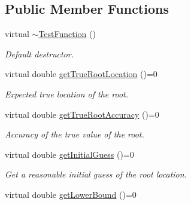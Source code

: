\subsection*{Public Member Functions}
\begin{DoxyCompactItemize}
\item 
virtual \hyperlink{structtudat_1_1unit__tests_1_1TestFunction_a48104bbfd74ad6abf913cafc4eda7abd}{$\sim$\+Test\+Function} ()\hypertarget{structtudat_1_1unit__tests_1_1TestFunction_a48104bbfd74ad6abf913cafc4eda7abd}{}\label{structtudat_1_1unit__tests_1_1TestFunction_a48104bbfd74ad6abf913cafc4eda7abd}

\begin{DoxyCompactList}\small\item\em Default destructor. \end{DoxyCompactList}\item 
virtual double \hyperlink{structtudat_1_1unit__tests_1_1TestFunction_abb3a0d4bf48c87d0527fb7397e354332}{get\+True\+Root\+Location} ()=0\hypertarget{structtudat_1_1unit__tests_1_1TestFunction_abb3a0d4bf48c87d0527fb7397e354332}{}\label{structtudat_1_1unit__tests_1_1TestFunction_abb3a0d4bf48c87d0527fb7397e354332}

\begin{DoxyCompactList}\small\item\em Expected true location of the root. \end{DoxyCompactList}\item 
virtual double \hyperlink{structtudat_1_1unit__tests_1_1TestFunction_aa9098ec74b5d6ecd616ed84b41ae4c39}{get\+True\+Root\+Accuracy} ()=0\hypertarget{structtudat_1_1unit__tests_1_1TestFunction_aa9098ec74b5d6ecd616ed84b41ae4c39}{}\label{structtudat_1_1unit__tests_1_1TestFunction_aa9098ec74b5d6ecd616ed84b41ae4c39}

\begin{DoxyCompactList}\small\item\em Accuracy of the true value of the root. \end{DoxyCompactList}\item 
virtual double \hyperlink{structtudat_1_1unit__tests_1_1TestFunction_ad97a92c0147206c0f4af9fc4e4ae210c}{get\+Initial\+Guess} ()=0\hypertarget{structtudat_1_1unit__tests_1_1TestFunction_ad97a92c0147206c0f4af9fc4e4ae210c}{}\label{structtudat_1_1unit__tests_1_1TestFunction_ad97a92c0147206c0f4af9fc4e4ae210c}

\begin{DoxyCompactList}\small\item\em Get a reasonable initial guess of the root location. \end{DoxyCompactList}\item 
virtual double \hyperlink{structtudat_1_1unit__tests_1_1TestFunction_a86026619c7617e7f216f93d31b053034}{get\+Lower\+Bound} ()=0\hypertarget{structtudat_1_1unit__tests_1_1TestFunction_a86026619c7617e7f216f93d31b053034}{}\label{structtudat_1_1unit__tests_1_1TestFunction_a86026619c7617e7f216f93d31b053034}


\end{DoxyCompactItemize}
